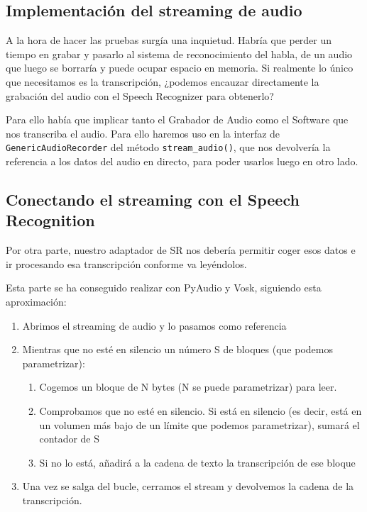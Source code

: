 \subsection{Implementación del streaming de audio}
A la hora de hacer las pruebas surgía una inquietud. Habría que perder un tiempo en grabar y pasarlo al sistema de reconocimiento del habla, de un audio que luego se borraría y puede ocupar espacio en memoria. Si realmente lo único que necesitamos es la transcripción, ¿podemos encauzar directamente la grabación del audio con el Speech Recognizer para obtenerlo? 

Para ello había que implicar tanto el Grabador de Audio como el Software que nos transcriba el audio. Para ello haremos uso en la interfaz de \\ \texttt{GenericAudioRecorder} del método \texttt{stream\_audio()}, que nos devolvería la referencia a los datos del audio en directo, para poder usarlos luego en otro lado.

\subsection{Conectando el streaming con el Speech Recognition}
Por otra parte, nuestro adaptador de SR nos debería permitir coger esos datos e ir procesando esa transcripción conforme va leyéndolos.

Esta parte se ha conseguido realizar con PyAudio y Vosk, siguiendo esta aproximación:

\begin{enumerate}
	\item Abrimos el streaming de audio y lo pasamos como referencia
	\item Mientras que no esté en silencio un número S de bloques (que podemos parametrizar):
	\begin{enumerate}
		\item Cogemos un bloque de N bytes (N se puede parametrizar) para leer.
		\item Comprobamos que no esté en silencio. Si está en silencio (es decir, está en un volumen más bajo de un límite que podemos parametrizar), sumará el contador de S
		\item Si no lo está, añadirá a la cadena de texto la transcripción de ese bloque
	\end{enumerate}
	\item Una vez se salga del bucle, cerramos el stream y devolvemos la cadena de la transcripción.
\end{enumerate}

